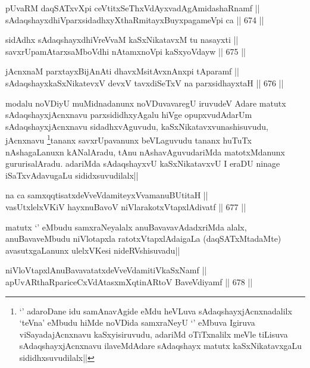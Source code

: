 \begin{shl}
pUvaRM daqSATxvX\s pi ceVtitxSeThxVdAyxvadAgAmidashaRnamf || \\
sAdaqshayxdhiVparxsidadhxyXthaRmitayxBuyxpagameV\s pi ca ||  674 ||  
\end{shl}
				
\begin{shl}
sidAdhx sAdaqshayxdhiVreVvaM kaSxNikatavxM tu nasayxti || \\
savxrUpamAtarxsaMboVdhi nA\s \s tamxnoV\s pi kaSxyoVdayw ||  675 ||  
\end{shl}

\begin{shl}
jAcnxnaM parxtayxBijAnAti dhavxMsitAvxnAnxpi tAparamf || \\
sAdaqshayxkaSxNikatevxV devxV tavxdiSeTxV na parxsidhayxtaH ||  676 ||  
\end{shl}

\begin{artha}
modalu noVDiyU muMidnadanunx noVDuvavaregU iruvudeV Adare matutx sAdaqshayxjAcnxnavu parxsididhxyAgalu hiVge opupxvudAdarUm sAdaqshayxjAcnxnavu sidadhxvAguvudu, kaSxNikatavxvunashisuvudu, jAcnxnavu \footnote{`\stext' adaroDane idu samAnavAgide eMdu heVLuva sAdaqshayxjAcnxnadalilx  `teVna' eMbudu hiMde noVDida samxraNeyU `\stext' eMbuva Igiruva viSayadajAcnxnavu kaSxyisiruvudu, adariMd oTiTxnalilx meVle tiLisuva sAdaqshayxjAcnxnavu ilaveMdAdare sAdaqshayx matutx kaSxNikatavxgaLu sididhxsuvudilalx||}tananx savxrUpavanunx beVLaguvudu tananx huTuTx nAshagaLanuxn kANalAradu, tAnu nAshavAguvudariMda matotxMdanunx gururisalAradu. adariMda sAdaqshayxvU kaSxNikatavxvU I eraDU ninage iSaTxvAdavugaLu sididxsuvudilalx||
\end{artha}

\begin{shl}
na ca samxqqtisatxdeVveVdamiteyxVvamanuBUtitaH || \\
vasUtxlelxVKiV hayxnuBavoV niVlarakotxVtapxlAdivatf ||  677 ||  
\end{shl}

\begin{artha}
matutx `\stext' eMbudu samxraNeyalalx anuBavavavAdadxriMda alalx, anuBavaveMbudu niVlotapxla ratotxVtapxlAdaigaLa (daqSATxMtadaMte) avasutxgaLanunx ulelxVKesi nideRVshisuvadu||
\end{artha}

\begin{shl}
niVloVtapxlAnuBavavatatxdeVveVdamitiVkaSxNamf || \\
apUvARthaRpariceCxVdAtasxmXqtinARtoV BaveVdiyamf ||  678 ||  
\end{shl}

